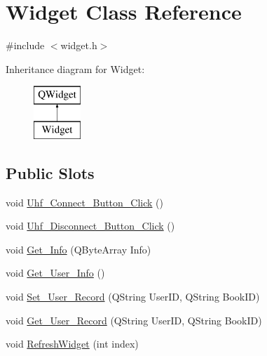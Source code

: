 \hypertarget{class_widget}{}\section{Widget Class Reference}
\label{class_widget}


{\ttfamily \#include $<$widget.\+h$>$}

Inheritance diagram for Widget\+:\begin{figure}[H]
\begin{center}
\leavevmode
\includegraphics[height=2.000000cm]{class_widget}
\end{center}
\end{figure}
\subsection*{Public Slots}
\begin{DoxyCompactItemize}
\item 
void \mbox{\hyperlink{class_widget_acceb5443a97ee9023250cda33f183bef}{Uhf\+\_\+\+Connect\+\_\+\+Button\+\_\+\+Click}} ()
\item 
void \mbox{\hyperlink{class_widget_a0186f9125495a90a0166280d932ae831}{Uhf\+\_\+\+Disconnect\+\_\+\+Button\+\_\+\+Click}} ()
\item 
void \mbox{\hyperlink{class_widget_a0b1204d50863ef19c6ed3e39ab455d25}{Get\+\_\+\+Info}} (Q\+Byte\+Array Info)
\item 
void \mbox{\hyperlink{class_widget_a349b456bf6a673058ef7449e44866e90}{Get\+\_\+\+User\+\_\+\+Info}} ()
\item 
void \mbox{\hyperlink{class_widget_a97f2c2eda030b7236e02c5f5e10c8926}{Set\+\_\+\+User\+\_\+\+Record}} (Q\+String User\+ID, Q\+String Book\+ID)
\item 
void \mbox{\hyperlink{class_widget_a743bf0399f3c3972556443c2576386be}{Get\+\_\+\+User\+\_\+\+Record}} (Q\+String User\+ID, Q\+String Book\+ID)
\item 
void \mbox{\hyperlink{class_widget_a07120b41431597f8e2d0eb86098a6ba7}{Refresh\+Widget}} (int index)
\end{DoxyCompactItemize}
